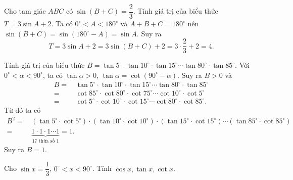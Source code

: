 \begin{bt}[Mức độ 2]%
	Cho tam giác $ABC$ có $\sin(B+C)=\dfrac{2}{3}$. Tính giá trị của biểu thức $T=3\sin{A}+2$.
	\loigiai
	{Ta có $0^\circ <A<180^\circ$ và $A+B+C=180^\circ$ nên $\sin(B+C)=\sin\left(180^\circ-A\right)=\sin{A}$. Suy ra
		$$T=3\sin{A}+2 = 3\sin(B+C)+2 = 3\cdot \dfrac{2}{3}+2=4.$$}
\end{bt}

\begin{bt}[Mức độ 3]%
	Tính giá trị của biểu thức 
	$B=\tan5^\circ \cdot \tan10^\circ \cdot \tan15^\circ \cdots \tan80^\circ \cdot \tan85^\circ$.
	\loigiai
	{Với $0^\circ <\alpha <90^\circ$, ta có $\tan\alpha>0$, $\tan\alpha = \cot\left(90^\circ -\alpha\right)$. Suy ra $B>0$ và
		\allowdisplaybreaks
		\begin{align*}
			B=&\, \tan5^\circ \cdot \tan10^\circ \cdot \tan15^\circ \cdots \tan80^\circ \cdot \tan85^\circ\\
			=&\, \cot85^\circ \cdot \cot80^\circ \cdot \cot75^\circ \cdots \cot10^\circ \cdot \cot5^\circ\\
			=&\, \cot5^\circ \cdot \cot10^\circ \cdot \cot15^\circ \cdots \cot80^\circ \cdot \cot85^\circ.
		\end{align*}
		Từ đó ta có
		\allowdisplaybreaks
		\begin{align*}
			B^2=&\, \left(\tan5^\circ \cdot \cot5^\circ\right) \cdot \left(\tan10^\circ \cdot \cot10^\circ\right) \cdot \left(\tan15^\circ \cdot \cot15^\circ\right) \cdots \left(\tan85^\circ \cdot \cot85^\circ\right)\\
			=&\, \underbrace{1\cdot 1 \cdot 1 \cdots 1}\limits_{17 \text{ thừa số }1} =1.
		\end{align*}
		Suy ra $B=1$.}
\end{bt}

\begin{bt}%
	Cho $\sin x=\dfrac{1}{3}$, $0^{\circ}<x<90^{\circ}$. Tính $\cos x, \tan x, \cot x$.
\end{bt}

